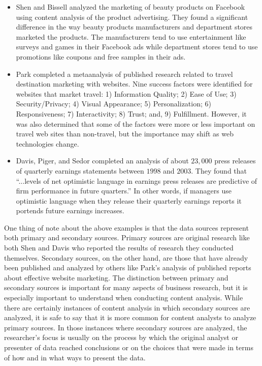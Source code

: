 \begin{itemize}
	\item Shen and Bissell\cite{shen2013social} analyzed the marketing of beauty products on Facebook using content analysis of the product advertising. They found a significant difference in the way beauty products manufacturers and department stores marketed the products. The manufacturers tend to use entertainment like surveys and games in their Facebook ads while department stores tend to use promotions like coupons and free samples in their ads.

	\item Park\cite{park2007success} completed a \gls{metaanalysis} of published research related to travel destination marketing with websites. Nine success factors were identified for websites that market travel: 1) Information Quality; 2) Ease of Use; 3) Security/Privacy; 4) Visual Appearance; 5) Personalization; 6) Responsiveness; 7) Interactivity; 8) Trust; and, 9) Fulfillment. However, it was also determined that some of the factors were more or less important on travel web sites than non-travel, but the importance may shift as web technologies change.

	\item Davis, Piger, and Sedor\cite{davis2012beyond} completed an analysis of about $ 23,000 $ press releases of quarterly earnings statements between $ 1998 $ and $ 2003 $. They found that ``...levels of net optimistic language in earnings press releases are predictive of firm performance in future quarters.'' In other words, if managers use optimistic language when they release their quarterly earnings reports it portends future earnings increases.
\end{itemize} 

One thing of note about the above examples is that the data sources represent both primary and secondary sources. Primary sources are original research like both Shen and Davis who reported the results of research they conducted themselves. Secondary sources, on the other hand, are those that have already been published and analyzed by others like Park's analysis of published reports about effective website marketing. The distinction between primary and secondary sources is important for many aspects of business research, but it is especially important to understand when conducting content analysis. While there are certainly instances of content analysis in which secondary sources are analyzed, it is safe to say that it is more common for content analysts to analyze primary sources. In those instances where secondary sources are analyzed, the researcher's focus is usually on the process by which the original analyst or presenter of data reached conclusions or on the choices that were made in terms of how and in what ways to present the data.

